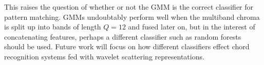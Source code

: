 This raises the question of whether or not the GMM is the correct classifier for pattern matching. GMMs undoubtably perform well when the multiband chroma is split up into bands of length $Q=12$ and fused later on, but in the interest of concatenating features, perhaps a different classifier such as random forests should be used. Future work will focus on how different classifiers effect chord recognition systems fed with wavelet scattering representations.